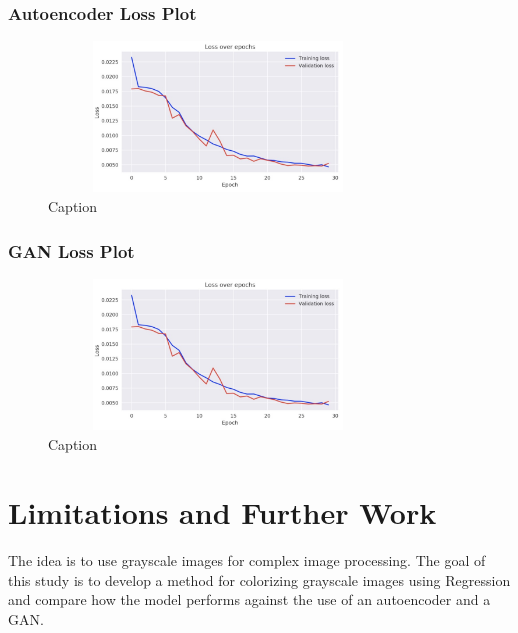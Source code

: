 \documentclass{article}
\begin{document}
\subsubsection{Autoencoder Loss Plot}

\begin{figure}[htbp!]
\begin{center}
    \includegraphics[width=9cm, height=4cm]{encoder-decoder-plot.jpg}
    \caption{Caption}
\end{center}
\end{figure}


\subsubsection{GAN Loss Plot}

\begin{figure}[htbp!]
\begin{center}
    \includegraphics[width=9cm, height=4cm]{encoder-decoder-plot.jpg}
    \caption{Caption}
\end{center}
\end{figure}
\pagebreak

\section{Limitations and Further Work}
The idea is to use grayscale images for complex image processing. The goal of this
study is to develop a method for colorizing grayscale images using Regression and
compare how the model performs against the use of an autoencoder and a GAN. 
\end{document}
